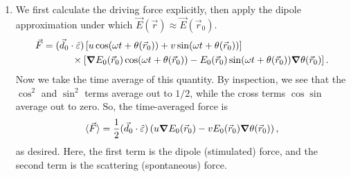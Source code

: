 \documentclass{article}
\theoremstyle{definition}
\newcommand{\f}[2]{\frac{#1}{#2}}
\newcommand{\lp}{\left(}
\newcommand{\rp}{\right)}
\newcommand{\lb}{\left[}
\newcommand{\rb}{\right]}
\begin{document}
\begin{enumerate}[label=\alph*)]

	\item We first calculate the driving force explicitly, then apply the dipole approximation under which $\vec{E}(\vec{r}) \approx \vec{E}(\vec{r}_0)$. 
	\begin{align*}
	\vec{F} &= (\vec{d}_0 \cdot \hat{\varepsilon}) \lb u \cos(\omega t + \theta(\vec{r}_0))  + v\sin(\omega t + \theta(\vec{r}_0)) \rb \\
	&\quad\quad\quad \times \lb \grad E_0(\vec{r}_0)  \cos(\omega t + \theta(\vec{r}_0)) - E_0(\vec{r}_0)\sin (\omega t  + \theta(\vec{r}_0)) \grad \theta(\vec{r}_0)\rb.
	\end{align*}
	Now we take the time average of this quantity. By inspection, we see that the $\cos^2$ and $\sin^2$ terms average out to $1/2$, while the cross terms $\cos \sin$ average out to zero. So, the time-averaged force is 
	\begin{align*}
	\langle \vec{F}\rangle = \f{1}{2} (\vec{d}_0 \cdot \hat{\varepsilon}) \lp u \grad E_0(\vec{r}_0)  - vE_0(\vec{r}_0) \grad \theta (\vec{r}_0)  \rp,
	\end{align*}
	as desired. Here, the first term is the dipole (stimulated) force, and the second term is the scattering (spontaneous) force. 
	

\end{enumerate}
\end{document}
